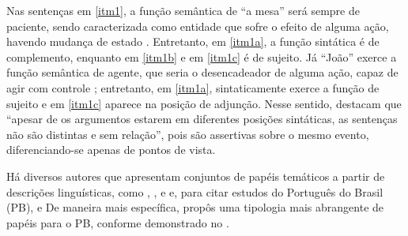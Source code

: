 Nas sentenças em \ref{itm1}, a função semântica de ``a mesa'' será sempre de
paciente, sendo caracterizada como entidade que sofre o efeito de alguma
ação, havendo mudança de estado \cite{cançado2017}. Entretanto, em
\ref{itm1a}, a função sintática é de complemento, enquanto em \ref{itm1b} e em \ref{itm1c} é
de sujeito. Já ``João'' exerce a função semântica de agente, que seria o
desencadeador de alguma ação, capaz de agir com controle \cite{cançado2017}; entretanto, em \ref{itm1a}, sintaticamente exerce a função de
sujeito e em \ref{itm1c} aparece na posição de adjunção. Nesse sentido, \textcite[p.~40]{cançado2017} destacam que ``apesar de os argumentos estarem em
diferentes posições sintáticas, as sentenças não são distintas e sem
relação'', pois são assertivas sobre o mesmo evento, diferenciando-se
apenas de pontos de vista.

Há diversos autores que apresentam conjuntos de papéis temáticos a
partir de descrições linguísticas, como \textcite{halliday1966}, \textcite{fillmore1968}, \textcite{chafe1970} e \textcite{jackendoff1976} e, para citar estudos do
Português do Brasil (PB), \textcite{geraldi1987} e \textcite{cançado2016} De maneira mais específica, \textcite{cançado2012} propôs uma tipologia
mais abrangente de papéis para o PB, conforme demonstrado no .

